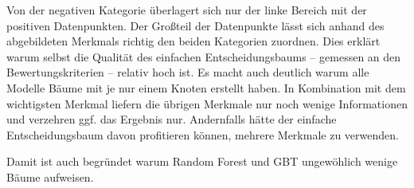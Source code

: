 Von der negativen Kategorie überlagert sich nur der linke Bereich mit der positiven Datenpunkten. Der Großteil der Datenpunkte lässt sich anhand des abgebildeten Merkmals richtig den beiden Kategorien zuordnen. Dies erklärt warum selbst die Qualität des einfachen Entscheidungsbaums -- gemessen an den Bewertungskriterien -- relativ hoch ist. Es macht auch deutlich warum alle Modelle Bäume mit je nur einem Knoten erstellt haben. In Kombination mit dem wichtigsten Merkmal liefern die übrigen Merkmale nur noch wenige Informationen und verzehren ggf. das Ergebnis nur. Andernfalls hätte der einfache Entscheidungsbaum davon profitieren können, mehrere Merkmale zu verwenden.

Damit ist auch begründet warum Random Forest und GBT ungewöhlich wenige Bäume aufweisen.